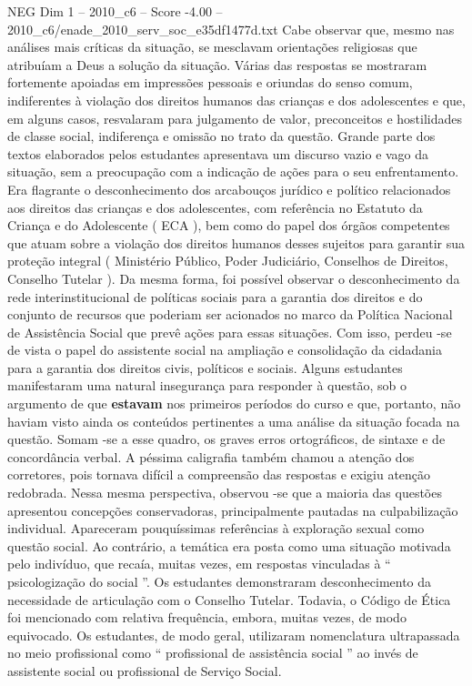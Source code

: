 \begin{textsample}{NEG Dim 1 – 2010\_c6 – Score -4.00 – 2010\_c6/enade\_2010\_serv\_soc\_e35df1477d.txt}
Cabe observar que, mesmo nas análises mais críticas da situação, se mesclavam orientações religiosas que atribuíam a Deus a solução da situação.
Várias das respostas se mostraram fortemente apoiadas em impressões pessoais e oriundas do senso comum, indiferentes à violação dos direitos humanos das crianças e dos adolescentes e que, em alguns casos, resvalaram para julgamento de valor, preconceitos e hostilidades de classe social, indiferença e omissão no trato da questão.
Grande parte dos textos elaborados pelos estudantes apresentava um discurso vazio e vago da situação, sem a preocupação com a indicação de ações para o seu enfrentamento.
Era flagrante o desconhecimento dos arcabouços jurídico e político relacionados aos direitos das crianças e dos adolescentes, com referência no Estatuto da Criança e do Adolescente ( ECA ), bem como do papel dos órgãos competentes que atuam sobre a violação dos direitos humanos desses sujeitos para garantir sua proteção integral ( Ministério Público, Poder Judiciário, Conselhos de Direitos, Conselho Tutelar ).
Da mesma forma, foi possível observar o desconhecimento da rede interinstitucional de políticas sociais para a garantia dos direitos e do conjunto de recursos que poderiam ser acionados no marco da Política Nacional de Assistência Social que prevê ações para essas situações.
Com isso, perdeu -se de vista o papel do assistente social na ampliação e consolidação da cidadania para a garantia dos direitos civis, políticos e sociais.
Alguns estudantes manifestaram uma natural insegurança para responder à questão, sob o argumento de que \textbf{estavam} nos primeiros períodos do curso e que, portanto, não haviam visto ainda os conteúdos pertinentes a uma análise da situação focada na questão.
Somam -se a esse quadro, os graves erros ortográficos, de sintaxe e de concordância verbal.
A péssima caligrafia também chamou a atenção dos corretores, pois tornava difícil a compreensão das respostas e exigiu atenção redobrada.
Nessa mesma perspectiva, observou -se que a maioria das questões apresentou concepções conservadoras, principalmente pautadas na culpabilização individual.
Apareceram pouquíssimas referências à exploração sexual como questão social.
Ao contrário, a temática era posta como uma situação motivada pelo indivíduo, que recaía, muitas vezes, em respostas vinculadas à “ psicologização do social ”.
Os estudantes demonstraram desconhecimento da necessidade de articulação com o Conselho Tutelar.
Todavia, o Código de Ética foi mencionado com relativa frequência, embora, muitas vezes, de modo equivocado.
Os estudantes, de modo geral, utilizaram nomenclatura ultrapassada no meio profissional como “ profissional de assistência social ” ao invés de assistente social ou profissional de Serviço Social.

\end{textsample}
